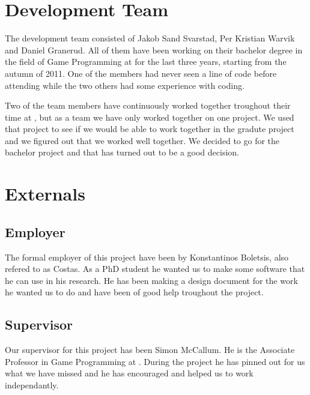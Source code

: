 \chapter{Development Team}
The development team consisted of Jakob Sand Svarstad, Per Kristian Warvik and Daniel Granerud.
All of them have been working on their bachelor degree in the field of Game Programming at \GUC{} for the last three years, starting from the autumn of 2011. One of the members had never seen a line of code before attending \GUC{} while the two others had some experience with coding.

Two of the team members have continuously worked together troughout their time at \GUC{}, but as a team we have only worked together on one project. We used that project to see if we would be able to work together in the gradute project and we figured out that we worked well together. We decided to go for the bachelor project and that has turned out to be a good decision.

\chapter{Externals}

\section{Employer}
The formal employer of this project have been \GUC{} by Konstantinos Boletsis, also refered to as Costas. As a PhD student he wanted us to make some software that he can use in his research. He has been making a design document for the work he wanted us to do and have been of good help troughout the project.

\section{Supervisor}
Our supervisor for this project has been Simon McCallum. He is the Associate Professor in Game Programming at \GUC{}. During the project he has pinned out for us what we have missed and he has encouraged and helped us to work independantly.



